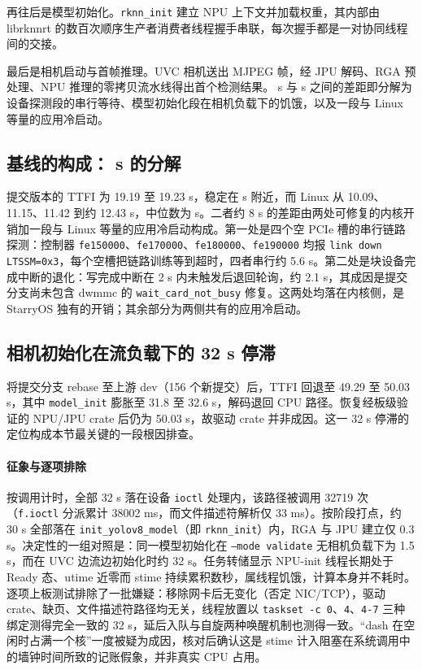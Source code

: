 再往后是模型初始化。\texttt{rknn\_init} 建立 NPU 上下文并加载权重，其内部由 librknnrt 的数百次顺序生产者消费者线程握手串联，每次握手都是一对协同线程间的交接。

最后是相机启动与首帧推理。UVC 相机送出 MJPEG 帧，经 JPU 解码、RGA 预处理、NPU 推理的零拷贝流水线得出首个检测结果。\nTtfiBefore{} s 与 \nTtfiLin s 之间的差距即分解为设备探测段的串行等待、模型初始化段在相机负载下的饥饿，以及一段与 Linux 等量的应用冷启动。

\subsection{基线的构成：\nTtfiBefore{} s 的分解}

提交版本的 TTFI 为 19.19 至 19.23 s，稳定在 \nTtfiBefore{} s 附近，而 Linux 从 10.09、11.15、11.42 到约 12.43 s，中位数为 \nTtfiLin s。二者约 8 s 的差距由两处可修复的内核开销加一段与 Linux 等量的应用冷启动构成。第一处是四个空 PCIe 槽的串行链路探测：控制器 \texttt{fe150000}、\texttt{fe170000}、\texttt{fe180000}、\texttt{fe190000} 均报 \texttt{link down LTSSM=0x3}，每个空槽把链路训练等到超时，四者串行约 5.6 s。第二处是块设备完成中断的退化：写完成中断在 2 s 内未触发后退回轮询，约 2.1 s，其成因是提交分支尚未包含 dwmmc 的 \texttt{wait\_card\_not\_busy} 修复。这两处均落在内核侧，是 StarryOS 独有的开销；其余部分为两侧共有的应用冷启动。

\subsection{相机初始化在流负载下的 32 s 停滞}

将提交分支 rebase 至上游 dev（156 个新提交）后，TTFI 回退至 49.29 至 50.03 s，其中 \texttt{model\_init} 膨胀至 31.8 至 32.6 s，解码退回 CPU 路径。恢复经板级验证的 NPU/JPU crate 后仍为 50.03 s，故驱动 crate 并非成因。这一 32 s 停滞的定位构成本节最关键的一段根因排查。

\paragraph{征象与逐项排除}
按调用计时，全部 32 s 落在设备 \texttt{ioctl} 处理内，该路径被调用 32719 次（\texttt{f.ioctl} 分派累计 38002 ms，而文件描述符解析仅 33 ms）。按阶段打点，约 30 s 全部落在 \texttt{init\_yolov8\_model}（即 \texttt{rknn\_init}）内，RGA 与 JPU 建立仅 0.3 s。决定性的一组对照是：同一模型初始化在 \texttt{--mode validate} 无相机负载下为 1.5 s，而在 UVC 边流边初始化时约 32 s。任务转储显示 NPU-init 线程长期处于 Ready 态、utime 近零而 stime 持续累积数秒，属线程饥饿，计算本身并不耗时。逐项上板测试排除了一批嫌疑：移除网卡后无变化（否定 NIC/TCP），驱动 crate、缺页、文件描述符路径均无关，线程放置以 \texttt{taskset -c 0}、\texttt{4}、\texttt{4-7} 三种绑定测得完全一致的 32 s，延后入队与自旋两种唤醒机制也测得一致。“dash 在空闲时占满一个核”一度被疑为成因，核对后确认这是 stime 计入阻塞在系统调用中的墙钟时间所致的记账假象，并非真实 CPU 占用。

